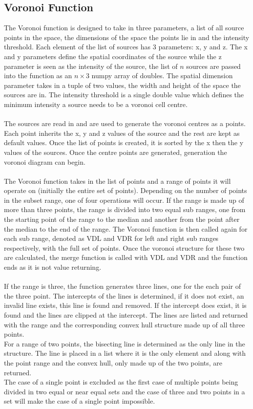 \subsection{Voronoi Function}
The Voronoi function is designed to take in three parameters, a list of all source points in the space, the dimensions of the space the points lie in and the intensity threshold. Each element of the list of sources has 3 parameters: x, y and z. The x and y parameters define the spatial coordinates of the source while the z parameter is seen as the intensity of the source, the list of $n$ sources are passed into the function as an $n \times 3$ numpy array of doubles. The spatial dimension parameter takes in a tuple of two values, the width and height of the space the sources are in. The intensity threshold is a single double value which defines the minimum intensity a source needs to be a voronoi cell centre.
\\
\\
The sources are read in and are used to generate the voronoi centres as a points. Each point inherits the x, y and z values of the source and the rest are kept as default values. Once the list of points is created, it is sorted by the x then the y values of the sources. Once the centre points are generated, generation the voronoi diagram can begin.
\\
\\
The Voronoi function takes in the list of points and a range of points it will operate on (initially the entire set of points). Depending on the number of points in the subset range, one of four operations will occur. If the range is made up of more than three points, the range is divided into two equal sub ranges, one from the starting point of the range to the median and another from the point after the median to the end of the range. The Voronoi function is then called again for each sub range, denoted as VDL and VDR for left and right sub ranges respectively, with the full set of points. Once the voronoi structure for these two are calculated, the merge function is called with VDL and VDR and the function ends as it is not value returning.
\\
\\
If the range is three, the function generates three lines, one for the each pair of the three point. The intercepts of the lines is determined, if it does not exist, an invalid line exists, this line is found and removed. If the intercept does exist, it is found and the lines are clipped at the intercept. The lines are listed and returned with the range and the corresponding convex hull structure made up of all three points.
\\
For a range of two points, the bisecting line is determined as the only line in the structure. The line is placed in a list where it is the only element and along with the point range and the convex hull, only made up of the two points, are returned.
\\
The case of a single point is excluded as the first case of multiple points being divided in two equal or near equal sets and the case of three and two points in a set will make the case of a single point impossible.

